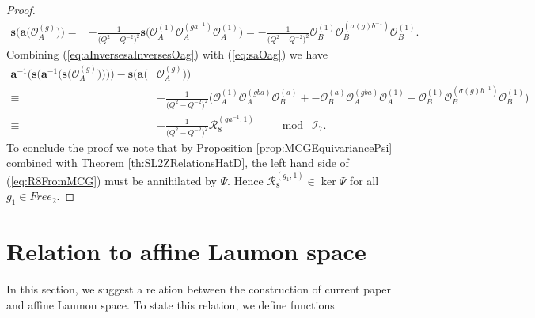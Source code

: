 \documentclass{amsart}
\newcommand{\Oa}{\mathcal O_A}
\newcommand{\Ob}{\mathcal O_B}
\newcommand{\R}{\mathcal R}
\begin{document}
\begin{proof}
\begin{equation}
\begin{aligned}
\mathbf s\big(\mathbf a\big(\Oa^{(g)}\big)\big)=&-\frac1{\big(Q^2-Q^{-2}\big)^2}\mathbf s\Big(\Oa^{(1)}\Oa^{(ga^{-1})}\Oa^{(1)}\Big)=-\frac1{\big(Q^2-Q^{-2}\big)^2}\Ob^{(1)}\Ob^{(\sigma(g)b^{-1})}\Ob^{(1)}.
\end{aligned}
\label{eq:saOag}
\end{equation}
Combining (\ref{eq:aInversesaInversesOag}) with (\ref{eq:saOag}) we have
\begin{equation}
\begin{aligned}
\mathbf a^{-1}\big(\mathbf s\big(\mathbf a^{-1}\big(\mathbf s\big(\Oa^{(g)}\big)\big)\big)\big)-\mathbf s\big(\mathbf a\big(&\Oa^{(g)}\big)\big)\\
\equiv&-\frac1{\big(Q^2-Q^{-2}\big)^2}\Big(\Oa^{(1)}\Oa^{(gba)}\Ob^{(a)}+-\Ob^{(a)}\Oa^{(gba)}\Oa^{(1)}-\Ob^{(1)}\Ob^{(\sigma(g)b^{-1})}\Ob^{(1)}\Big)\\
\equiv&-\frac1{\big(Q^2-Q^{-2}\big)^2}\R_8^{(ga^{-1},1)}\qquad\bmod\;\mathcal I_7.
\end{aligned}
\label{eq:R8FromMCG}
\end{equation}
To conclude the proof we note that by Proposition \ref{prop:MCGEquivariancePsi} combined with Theorem \ref{th:SL2ZRelationsHatD}, the left hand side of (\ref{eq:R8FromMCG}) must be annihilated by $\Psi$. Hence $\R_8^{(g_1,1)}\in\ker\Psi$ for all $g_1\in Free_2$.
\end{proof}

\section{Relation to affine Laumon space}
\label{sec:RelationToLaumon}

In this section, we suggest a relation between the construction of current paper and affine Laumon space. To state this relation, we define functions 
\end{document}
